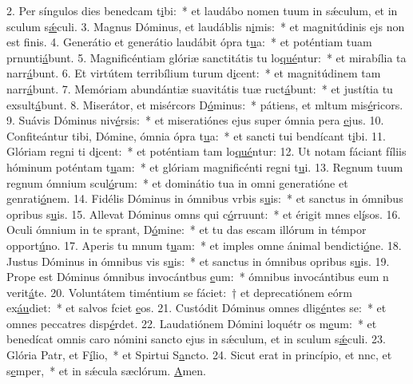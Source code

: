 2. Per síngulos dies benedcam t\uline{i}bi:~* et laudábo nomen tuum in sǽculum, et in sculum s\uline{ǽ}culi.
3. Magnus Dóminus, et laudáblis n\uline{i}mis:~* et magnitúdinis ejs non est f\uline{i}nis.
4. Generátio et generátio laudábit ópra t\uline{u}a:~* et poténtiam tuam prnunti\uline{á}bunt.
5. Magnificéntiam glóriæ sanctitátis tu lo\uline{qué}ntur:~* et mirabília ta narr\uline{á}bunt.
6. Et virtútem terribílium turum d\uline{i}cent:~* et magnitúdinem tam narr\uline{á}bunt.
7. Memóriam abundántiæ suavitátis tuæ ruct\uline{á}bunt:~* et justítia tu exsult\uline{á}bunt.
8. Miserátor, et misércors D\uline{ó}minus:~* pátiens, et mltum mis\uline{é}ricors.
9. Suávis Dóminus niv\uline{é}rsis:~* et miseratiónes ejus super ómnia pera \uline{e}jus.
10. Confiteántur tibi, Dómine, ómnia ópra t\uline{u}a:~* et sancti tui bendícant t\uline{i}bi.
11. Glóriam regni ti d\uline{i}cent:~* et poténtiam tam lo\uline{qué}ntur:
12. Ut notam fáciant fíliis hóminum poténtam t\uline{u}am:~* et glóriam magnificénti regni t\uline{u}i.
13. Regnum tuum regnum ómnium scul\uline{ó}rum:~* et dominátio tua in omni generatióne et genrati\uline{ó}nem.
14. Fidélis Dóminus in ómnibus vrbis s\uline{u}is:~* et sanctus in ómnibus opribus s\uline{u}is.
15. Allevat Dóminus omns qui c\uline{ó}rruunt:~* et érigit mnes el\uline{í}sos.
16. Oculi ómnium in te sprant, D\uline{ó}mine:~* et tu das escam illórum in témpor opport\uline{ú}no.
17. Aperis tu mnum t\uline{u}am:~* et imples omne ánimal bendicti\uline{ó}ne.
18. Justus Dóminus in ómnibus vis s\uline{u}is:~* et sanctus in ómnibus opribus s\uline{u}is.
19. Prope est Dóminus ómnibus invocántbus \uline{e}um:~* ómnibus invocántibus eum n verit\uline{á}te.
20. Voluntátem timéntium se fáciet:~† et deprecatiónem eórm ex\uline{áu}diet:~* et salvos fciet \uline{e}os.
21. Custódit Dóminus omnes dlig\uline{é}ntes se:~* et omnes peccatres disp\uline{é}rdet.
22. Laudatiónem Dómini loquétr os m\uline{e}um:~* et benedícat omnis caro nómini sancto ejus in sǽculum, et in sculum s\uline{ǽ}culi.
23. Glória Patr, et F\uline{í}lio,~* et Spirtui S\uline{a}ncto.
24. Sicut erat in princípio, et nnc, et s\uline{e}mper,~* et in sǽcula sæclórum. \uline{A}men.
